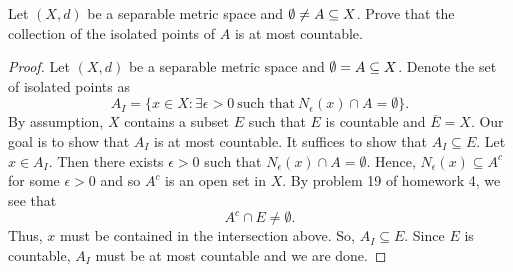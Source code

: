 \documentclass[a4paper]{article}
\begin{document}
   \begin{problem}
       Let \( (X,d) \) be a separable metric space and \( \emptyset \neq A \subseteq X  \). Prove that the collection of the isolated points of \( A  \) is at most countable.
   \end{problem}
   \begin{proof}
       Let \( (X,d) \) be a separable metric space and \( \emptyset = A \subseteq  X  \). Denote the set of isolated points as 
       \[  {A}_{I} = \{ x \in X : \exists \epsilon > 0 \ \text{such that} \ {N}_{\epsilon}(x) \cap A = \emptyset \}.  \]
       By assumption, \( X  \) contains a subset \( E  \) such that \( E  \) is countable and \( \overline{E} = X  \). Our goal is to show that \( {A}_{I} \) is at most countable. It suffices to show that \( {A}_{I} \subseteq E  \). Let \( x \in {A}_{I} \). Then there exists \( \epsilon > 0  \) such that \( {N}_{\epsilon}(x) \cap A = \emptyset \). Hence, \( {N}_{\epsilon}(x) \subseteq  A^{c} \) for some \( \epsilon > 0  \) and so \( A^{c} \) is an open set in \( X  \). By problem 19 of homework 4, we see that  
       \[  A^{c} \cap E \neq \emptyset. \]
       Thus, \( x  \) must be contained in the intersection above. So, \( {A}_{I} \subseteq E  \). Since \( E  \) is countable, \( {A}_{I} \) must be at most countable and we are done. 
   \end{proof}
\end{document}
